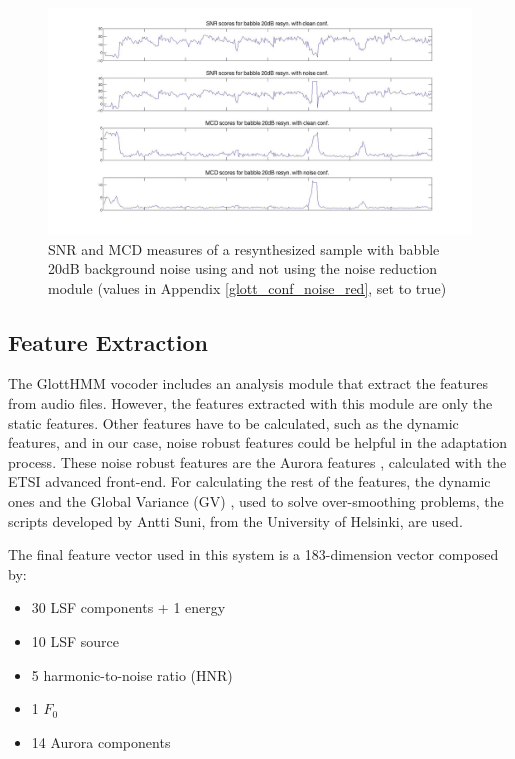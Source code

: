 \begin{figure}[!hb]
\begin{adjustwidth}{-2.6cm}{}
\includegraphics[width=1.3\textwidth]{images/babble20clean_vs_noise.jpg}
\end{adjustwidth}
\caption{SNR and MCD measures of a resynthesized sample with babble 20dB background noise using and not using the noise reduction module (values in Appendix \ref{glott_conf_noise_red}, set to true)}
\label{fig:babble20_clean_vs_noise}
\end{figure}

\subsection{Feature Extraction}
\label{experiments_feature_extraction}
The GlottHMM vocoder includes an analysis module that extract the features from audio files.
%
However, the features extracted with this module are only the static features. 
%
Other features have to be calculated, such as the dynamic features, and in our case, noise robust features could be helpful in the adaptation process.
%
These noise robust features are the Aurora features \cite{etsi202}, calculated with the ETSI advanced front-end.
%
For calculating the rest of the features, the dynamic ones and the Global Variance (GV) \cite{toda2005speech}, used to solve over-smoothing problems, the scripts developed by Antti Suni, from the University of Helsinki, are used.

The final feature vector used in this system is a 183-dimension vector composed by:

\begin{itemize}
	\item 30 LSF components + 1 energy
	\item 10 LSF source
	\item 5 harmonic-to-noise ratio (HNR)
	\item 1  $F_{0}$
	\item 14 Aurora components
\end{itemize}

